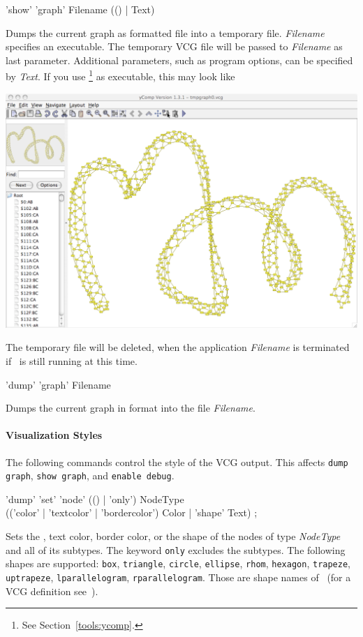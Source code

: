\begin{rail}
  'show' 'graph' Filename (() | Text)
\end{rail}
Dumps the current graph as  formatted file into a temporary file. \emph{Filename} specifies an executable. The temporary VCG file will be passed to \emph{Filename} as last parameter. Additional parameters, such as program options, can be specified by \emph{Text}. If you use \yComp\footnote{See Section~\ref{tools:ycomp}.} as executable, this may look like
\begin{center}
  \includegraphics[width=0.75\linewidth]{fig/showgraph}
\end{center}  
The temporary file will be deleted, when the application \emph{Filename} is terminated if \GrShell\ is still running at this time.

\begin{rail}
  'dump' 'graph' Filename
\end{rail}
Dumps the current graph in  format into the file \emph{Filename}.\\

\paragraph{Visualization Styles}
The following commands control the style of the VCG output. This affects \texttt{dump graph}, \texttt{show graph}, and \texttt{enable debug}. 
\begin{rail}
  'dump' 'set' 'node' (() | 'only') NodeType \\ (('color' | 'textcolor' | 'bordercolor') Color | 'shape' Text) ;
\end{rail}
Sets the , text color, border color, or the shape of the nodes of type \emph{NodeType} and all of its subtypes. The keyword \texttt{only} excludes the subtypes. The following shapes are supported: \texttt{box}, \texttt{triangle}, \texttt{circle}, \texttt{ellipse}, \texttt{rhom}, \texttt{hexagon}, \texttt{trapeze}, \texttt{uptrapeze}, \texttt{lparallelogram}, \texttt{rparallelogram}. Those are shape names of \yComp\ (for a VCG definition see~\cite{vcg}).

